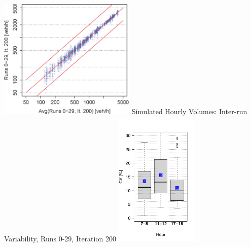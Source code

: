 {	{\includegraphics[width=0.49\textwidth]{understanding/figures/var/linkVolumesHour17-18InterScatter.png}}%
	{\label{fig:linkVolumesHour17-18InterScatter}}%
  {}%
	\createsubfigure%
  {Simulated Hourly Volumes: Inter-run Variability, Runs 0-29, Iteration 200}%
	{\includegraphics[width=0.3\textwidth]{understanding/figures/var/linkVolumesInter200.pdf}}%
	{\label{fig:linkVolumesInter200}}%
  {}%
}%
{} 

\vfill\eject

